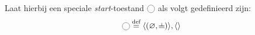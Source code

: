 Laat hierbij een speciale \emph{start}-toestand $\State{\phantom{A}}$ als volgt gedefinieerd zijn:
%
\begin{equation*}
  \State{\phantom{A}} \DEF \langle(\varnothing, \nil)\rangle, \langle\rangle
\end{equation*}
%
%
%
%
